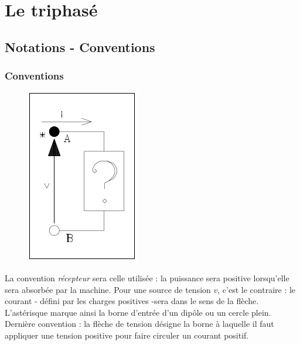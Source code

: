\chapter{Le triphasé}
\section{Notations - Conventions}
	
\subsection{Conventions}
\begin{figure}
	\vspace{-5mm}
	\includegraphics[scale=0.4]{ch1/image1.png}
\end{figure}
La convention \textit{récepteur} sera celle utilisée : la puissance 
sera positive lorsqu'elle sera absorbée par la machine. Pour une 
source de tension $v$, c'est le contraire : le courant - défini par 
les charges positives -sera dans le sens de la flèche.\\

L'astérisque 
marque ainsi la borne d'entrée d'un dipôle ou un cercle plein.\\
	
Dernière convention : la flèche de tension désigne la borne à 
laquelle il faut appliquer une tension positive pour faire circuler 
un courant positif.
	
